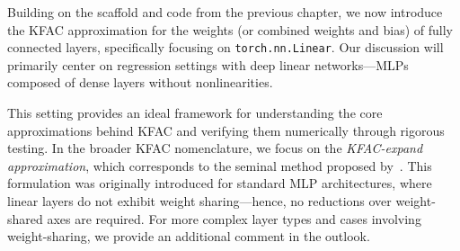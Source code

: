 Building on the scaffold and code from the previous chapter, we now introduce the KFAC approximation for the weights (or combined weights and bias) of fully connected layers, specifically focusing on \texttt{torch.nn.Linear}. 
Our discussion will primarily center on regression settings with deep linear networks---MLPs composed of dense layers without nonlinearities.

This setting provides an ideal framework for understanding the core approximations behind KFAC and verifying them numerically through rigorous testing.
In the broader KFAC nomenclature, we focus on the \emph{KFAC-expand approximation}, which corresponds to the seminal method proposed by~\citet{martens2015optimizing}.
This formulation was originally introduced for standard MLP architectures, where linear layers do not exhibit weight sharing---hence, no reductions over weight-shared axes are required.
For more complex layer types and cases involving weight-sharing, we provide an additional comment in the outlook.


